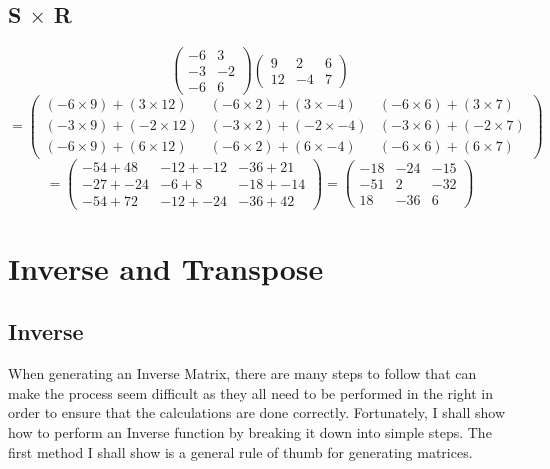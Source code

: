 \documentclass[a4paper,12pt]{article}
\begin{document}
      \subsection{S $\times$ R}
        \begin{equation}
          \begin{pmatrix}
            -6 & 3\\
            -3 & -2\\
            -6 & 6
          \end{pmatrix}
          \begin{pmatrix}
            9 & 2 & 6\\
            12 & -4 & 7
          \end{pmatrix}
        \end{equation}
        \begin{equation}
          =
          \begin{pmatrix}
            (-6 \times 9) + ( 3 \times 12) & (-6 \times 2) + ( 3 \times -4) & (-6 \times 6) + ( 3 \times 7)\\
            (-3 \times 9) + (-2 \times 12) & (-3 \times 2) + (-2 \times -4) & (-3 \times 6) + (-2 \times 7)\\
            (-6 \times 9) + ( 6 \times 12) & (-6 \times 2) + ( 6 \times -4) & (-6 \times 6) + ( 6 \times 7)
          \end{pmatrix}
        \end{equation}
        \begin{equation}
          =
          \begin{pmatrix}
            -54 +  48 & -12 + -12 & -36 +  21\\
            -27 + -24 & -6  +   8 & -18 + -14\\
            -54 +  72 & -12 + -24 & -36 +  42
          \end{pmatrix}
          =
          \begin{pmatrix}
            -18 & -24 & -15\\
            -51 &   2 & -32\\
             18 & -36 &   6
          \end{pmatrix}
        \end{equation}

    \newpage

    \section{Inverse and Transpose}
      \subsection{Inverse}
        When generating an Inverse Matrix, there are many steps to follow that can make the process seem difficult as they all need to be performed in the right in order to ensure that the calculations are done correctly. Fortunately, I shall show how to perform an Inverse function by breaking it down into simple steps. The first method I shall show is a general rule of thumb for generating matrices.
\end{document}
